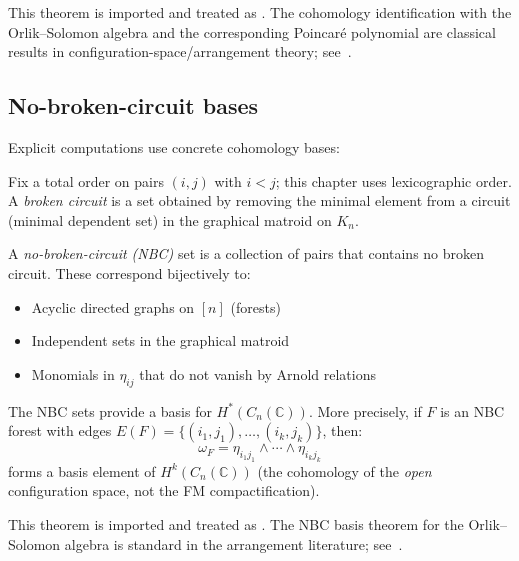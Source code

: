 \begin{remark}
This theorem is imported and treated as \ClaimStatusProvedElsewhere. The
cohomology identification with the Orlik--Solomon algebra and the corresponding
Poincar\'e polynomial are classical results in configuration-space/arrangement
theory; see~\cite{Arnold69,OS80}.
\end{remark}

\subsection{No-broken-circuit bases}

Explicit computations use concrete cohomology bases:

\begin{definition}
Fix a total order on pairs $(i, j)$ with $i < j$; this chapter uses
lexicographic order. A \emph{broken circuit} is a set obtained by
removing the minimal element from a circuit (minimal dependent set) in
the graphical matroid on $K_n$.
\end{definition}

\begin{definition}\label{def:nbc-basis}
A \emph{no-broken-circuit (NBC)} set is a collection of pairs that contains no broken circuit. These correspond bijectively to:
\begin{itemize}
\item Acyclic directed graphs on $[n]$ (forests)
\item Independent sets in the graphical matroid
\item Monomials in $\eta_{ij}$ that do not vanish by Arnold relations
\end{itemize}
\end{definition}

\begin{theorem}\label{thm:NBC}
The NBC sets provide a basis for $H^*(C_n(\mathbb{C}))$. More precisely, if $F$ is an NBC forest with edges $E(F) = \{(i_1, j_1), \ldots, (i_k, j_k)\}$, then:
\[
\omega_F = \eta_{i_1j_1} \wedge \cdots \wedge \eta_{i_kj_k}
\]
forms a basis element of $H^k(C_n(\mathbb{C}))$
(the cohomology of the \emph{open} configuration space, not the FM compactification).
\end{theorem}

\begin{remark}
This theorem is imported and treated as \ClaimStatusProvedElsewhere. The NBC
basis theorem for the Orlik--Solomon algebra is standard in the arrangement
literature; see~\cite{OS80}.
\end{remark}

